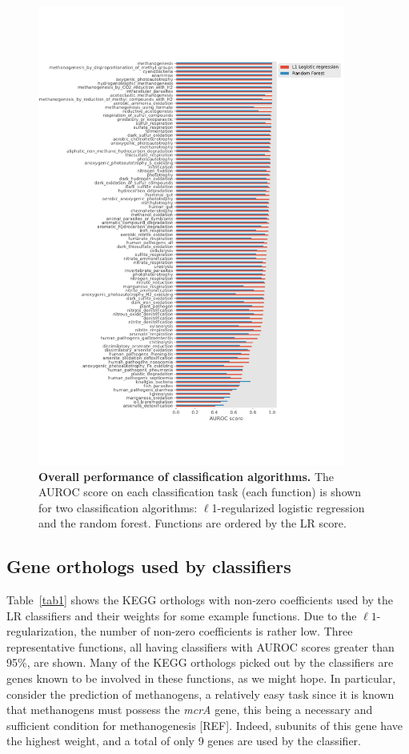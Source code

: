 \documentclass[10pt,letterpaper]{article}
\begin{document}
\begin{figure}[!h]
\includegraphics[width=0.9\textwidth]{fig1}
\caption{{\bf Overall performance of classification algorithms.}
The AUROC score on each classification task (each function) is shown for two classification algorithms: $\ell$1-regularized logistic regression and the random forest. Functions are ordered by the LR score.}
\label{fig1}
\end{figure}


\subsection*{Gene orthologs used by classifiers}
Table~\ref{tab1} shows the KEGG orthologs with non-zero coefficients used by the LR classifiers and their weights for some example functions. Due to the $\ell1$-regularization, the number of non-zero coefficients is rather low. Three representative functions, all having classifiers with AUROC scores greater than 95\%, are shown. Many of the KEGG orthologs picked out by the classifiers are genes known to be involved in these functions, as we might hope. In particular, consider the prediction of methanogens, a relatively easy task since it is known that methanogens must possess the \emph{mcrA} gene, this being a necessary and sufficient condition for methanogenesis [REF]. Indeed, subunits of this gene have the highest weight, and a total of only 9 genes are used by the classifier. 
\end{document}
